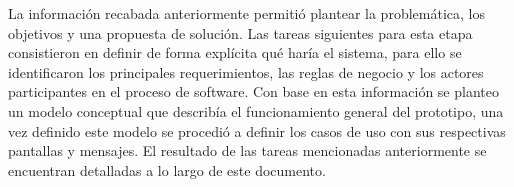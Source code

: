 

La información recabada anteriormente permitió plantear la problemática, los objetivos y una propuesta de solución. Las tareas siguientes para esta etapa consistieron en definir de forma explícita qué haría el sistema, para ello se identificaron los principales requerimientos, las reglas de negocio y los actores participantes en el proceso de software. Con base en esta información se planteo un modelo conceptual que describía el funcionamiento general del prototipo, una vez definido este modelo se procedió a definir los casos de uso con sus respectivas pantallas y mensajes. El resultado de las tareas mencionadas anteriormente se encuentran detalladas a lo largo de este documento.
